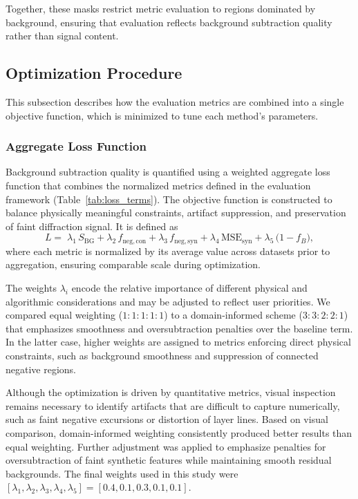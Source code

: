 \documentclass[iucr]{iucrjournals}
\begin{document}
Together, these masks restrict metric evaluation to regions dominated by background, ensuring that evaluation reflects background subtraction quality rather than signal content.





\subsection{Optimization Procedure}

This subsection describes how the evaluation metrics are combined into a single objective function, which is minimized to tune each method's parameters.

\subsubsection{Aggregate Loss Function}

Background subtraction quality is quantified using a weighted aggregate loss function that combines the normalized metrics defined in the evaluation framework (Table~\ref{tab:loss_terms}). The objective function is constructed to balance physically meaningful constraints, artifact suppression, and preservation of faint diffraction signal. It is defined as
\begin{equation}
L =\;
\lambda_1\, S_{\mathrm{BG}}
+ \lambda_2\, f_{\mathrm{neg,con}}
+ \lambda_3\, f_{\mathrm{neg,syn}}
+ \lambda_4\, \mathrm{MSE}_{\mathrm{syn}}
+ \lambda_5\, \bigl(1 - f_{B}\bigr),
\end{equation}
where each metric is normalized by its average value across datasets prior to aggregation, ensuring comparable scale during optimization.

The weights $\lambda_i$ encode the relative importance of different physical and algorithmic considerations and may be adjusted to reflect user priorities. We compared equal weighting ($1\!:\!1\!:\!1\!:\!1\!:\!1$) to a domain-informed scheme ($3\!:\!3\!:\!2\!:\!2\!:\!1$) that emphasizes smoothness and oversubtraction penalties over the baseline term. In the latter case, higher weights are assigned to metrics enforcing direct physical constraints, such as background smoothness and suppression of connected negative regions. 

Although the optimization is driven by quantitative metrics, visual inspection remains necessary to identify artifacts that are difficult to capture numerically, such as faint negative excursions or distortion of layer lines. Based on visual comparison, domain-informed weighting consistently produced better results than equal weighting. Further adjustment was applied to emphasize penalties for oversubtraction of faint synthetic features while maintaining smooth residual backgrounds. The final weights used in this study were $[\lambda_1, \lambda_2, \lambda_3, \lambda_4, \lambda_5] = [0.4, 0.1, 0.3, 0.1, 0.1]$.
\end{document}
